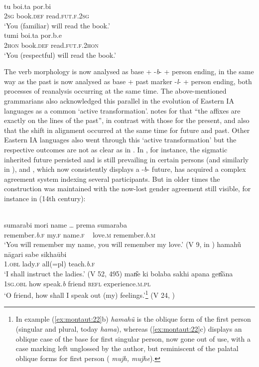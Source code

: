 \documentclass[output=paper]{langsci/langscibook}
\begin{document}
\ea
\label{ex:montaut:21}
\ea 
{}\\
\gll tu  boi.ta       por.bi\\
\textsc{2sg}   book.\textsc{def}   read.\textsc{fut.f.2sg} \\
\glt ‘You (familiar) will read the book.’
\ex  
{}\\
\gll tumi boi.ta         por.b.e\\
\textsc{2hon} book.\textsc{def}    read.\textsc{fut.f.2hon} \\
\glt ‘You (respectful) will read the book.’
\z 
\z 

The verb morphology is now analysed as base +  -\textit{b}- + person ending, in the same way as the past is now analysed as base + past marker -\textit{l}- + person ending, both processes of reanalysis occurring at the same time. The above-mentioned grammarians also acknowledged this parallel in the evolution of Eastern IA languages as a common ‘active transformation’. \citet[987]{Chatterji1926} notes for  that “the affixes are exactly on the lines of the past”, in contrast with those for the present, and also that the shift in alignment occurred at the same time for future and past.
  Other Eastern IA languages also went through this ‘active transformation’ but the respective outcomes are not as clear as in . In , for instance, the sigmatic inherited future persisted and is still prevailing in certain persons (and similarly in ), and , which now consistently displays a -\textit{b}- future, has acquired a complex agreement system indexing several participants. But in older times the construction was maintained with the now-lost gender agreement still visible, for instance in  (14th century):

\ea\label{ex:montaut:22}
\ea 
{}\\
\gll sumarabi  mori name  …     prema sumaraba\\
remember.\textit{b}\textsc{.f}    my.\textsc{f}  name\textsc{.f}  ~ love\textsc{.m} remember.\textit{b}.\textsc{m}  \\
\glt ‘You will remember my name, you will remember my love.’ (V 9, in \citealt[494]{Jha1958})
\ex  
\gll hamahũ   nāgari   sabe        sikhaūbi\\   
\textsc{1.obl}   lady.\textsc{f}     all(=pl)   teach.\textit{b}.\textsc{f} \\
\glt ‘I shall instruct the ladies.’ (V 52, \citealt[495]{Jha1958} 495)
\ex 
\gll man͂e ki bolaba sakhi apana gen͂āna\\ 
\textsc{1sg.obl} how   speak.\textit{b}   friend   \textsc{refl}     experience.\textsc{m.pl}\\
\glt ‘O friend, how shall I speak out (my) feelings.’\footnote{In example (\ref{ex:montaut:22}b) \textit{hamahũ} is the oblique form of the first person (singular and plural, today \textit{hama}), whereas (\ref{ex:montaut:22}c) displays an oblique case of the base for first singular person, now gone out of use, with a case marking left unglossed by the author, but reminiscent of the palatal oblique forms for first person ( \textit{mujh, mujhe}).} (V 24, \citealt[495]{Jha1958})
\z 
\z 
\end{document}
